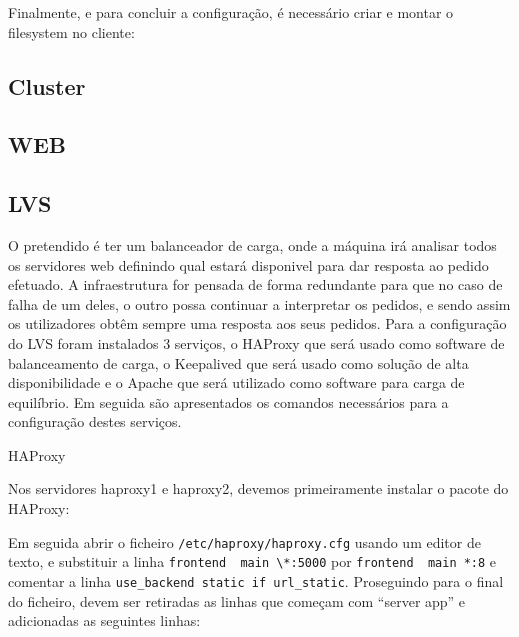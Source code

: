 Finalmente, e para concluir a configuração, é necessário criar e montar o filesystem no cliente:
 \par
{} \par


\subsection{Cluster}

\subsection{WEB}

\subsection{LVS}
O pretendido é ter um balanceador de carga, onde a máquina irá analisar todos os servidores web definindo qual estará disponivel para dar resposta ao pedido efetuado.
A infraestrutura for pensada de forma redundante para que no caso de falha de um deles, o outro possa continuar a interpretar os pedidos, e sendo assim os utilizadores obtêm sempre uma resposta aos seus pedidos.
Para a configuração do LVS foram instalados 3 serviços, o HAProxy que será usado como software de balanceamento de carga, o Keepalived que será usado como solução de alta disponibilidade e o Apache que será utilizado como software para carga de equilíbrio. Em seguida são apresentados os comandos necessários para a configuração destes serviços.


HAProxy

Nos servidores haproxy1 e haproxy2, devemos primeiramente instalar o pacote do HAProxy:
 \par

Em seguida abrir o ficheiro \verb+/etc/haproxy/haproxy.cfg+ usando um editor de texto, e substituir a linha \verb+frontend  main \*:5000+ por \verb+frontend  main *:8+ e comentar a linha \verb+use_backend static if url_static+.
Proseguindo para o final do ficheiro, devem ser retiradas as linhas que começam com “server app” e adicionadas as seguintes linhas:
 \par
{} \par

